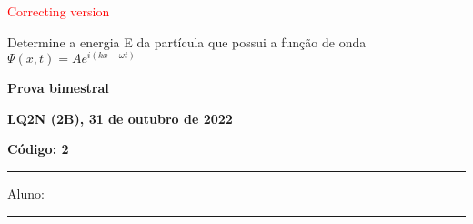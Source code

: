 \documentclass[12pt, addpoints]{exam}
\begin{document}
        \begin{center}
\textcolor{red}{\emph\Large Correcting version}\end{center}
\begin{questions}
\begin{multicols*}{2}
\question[20] Determine a energia E da partícula que possui a função de onda $\Psi(x,t)=Ae^{i(kx-\omega t)}$

\begin{oneparchoices}
\end{oneparchoices}
\end{multicols*}
\end{questions}
\newpage
        \begin{minipage}[b]{0.75\linewidth}
            \begin{flushleft}
                {\bf \large Prova bimestral}
            \end{flushleft}
            \begin{flushleft}
                {\bf \large LQ2N (2B), 31 de outubro de 2022}
            \end{flushleft}
        \end{minipage}
        \begin{minipage}[b]{0.20\linewidth}
            \begin{flushright}
                {\bf \large Código: 2}
            \end{flushright}
        \end{minipage}
        \vspace{0.5cm} \hrule \vspace{0.5cm}
        \begin{minipage}{0.75\linewidth}
            Aluno:
        \end{minipage}
        \vspace{0.5cm} \hrule \vspace{0.5cm}
\end{document}
